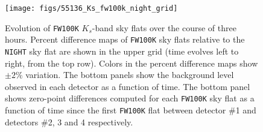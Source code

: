 \documentclass[iop]{emulateapj}
\newcommand{\Sec}[1]{\S\ref{sec:#1}}  %
\begin{document}
\begin{figure}[t]
\centering
\texttt{[image: figs/55136\_Ks\_fw100k\_night\_grid]}
\caption{
Evolution of \texttt{FW100K} $K_s$-band sky flats over the course of three hours.
Percent difference maps of \texttt{FW100K} sky flats relative to the \texttt{NIGHT} sky flat are shown in the upper grid (time evolves left to right, from the top row).
Colors in the percent difference maps show $\pm2\%$ variation.
The bottom panels show the background level observed in each detector as a function of time.
The bottom panel shows zero-point differences computed for each \texttt{FW100K} sky flat as a function of time since the first \texttt{FW100K} flat between detector \#1 and detectors \#2, 3 and 4 respectively.
}
\label{fig:fw100k_movie}
\end{figure}

\end{document}
